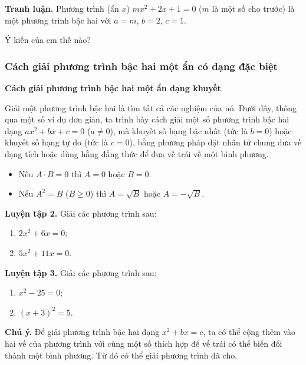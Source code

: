 \begin{lesson}
    \answerline
    \answerline

    \textbf{Tranh luận.} Phương trình (ẩn $x$) $mx^2+2x+1=0$ ($m$ là một số cho trước) là một phương trình bậc hai với $a=m$, $b=2$, $c=1$.

    Ý kiến của em thế nào?

    \answerline
    \answerline

    \subsubsection{Cách giải phương trình bậc hai một ẩn có dạng đặc biệt}

    \textbf{Cách giải phương trình bậc hai một ẩn dạng khuyết}

    Giải một phương trình bậc hai là tìm tất cả các nghiệm của nó. Dưới đây, thông qua một số ví dụ đơn giản, ta trình bày cách giải một số phương trình bậc hai dạng $ax^2+bx+c=0$ ($a\ne0$), mà khuyết số hạng bậc nhất (tức là $b=0$) hoặc khuyết số hạng tự do (tức là $c=0$), bằng phương pháp đặt nhân tử chung đưa về dạng tích hoặc dùng hằng đẳng thức để đưa vế trái về một bình phương.

    \begin{keyconcept}
        \begin{itemize}
            \item Nếu $A\cdot B=0$ thì $A=0$ hoặc $B=0$.
            \item Nếu $A^2=B$ ($B\ge0$) thì $A=\sqrt{B}$ hoặc $A=-\sqrt{B}$.
        \end{itemize}
    \end{keyconcept}

    \textbf{Luyện tập 2.} Giải các phương trình sau:
    \begin{enumerate}[label=\alph*)]
        \item $2x^2+6x=0$;
        \item $5x^2+11x=0$.
    \end{enumerate}

    \answerline
    \answerline

    \textbf{Luyện tập 3.} Giải các phương trình sau:
    \begin{enumerate}[label=\alph*)]
        \item $x^2-25=0$;
        \item $(x+3)^2=5$.
    \end{enumerate}

    \answerline
    \answerline

    \textbf{Chú ý.} Để giải phương trình bậc hai dạng $x^2+bx=c$, ta có thể cộng thêm vào hai vế của phương trình với cùng một số thích hợp để vế trái có thể biến đổi thành một bình phương. Từ đó có thể giải phương trình đã cho.


\end{lesson}
